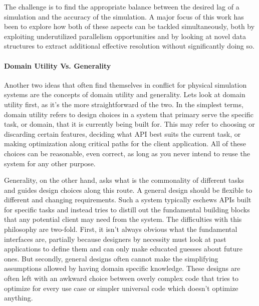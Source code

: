 The challenge is to find the appropriate balance between the desired
lag of a simulation and the accuracy of the simulation. A major
focus of this work has been to explore how both of these aspects can be
tackled simultaneously, both by exploiting underutilized parallelism
opportunities and by looking at novel data structures to extract
additional effective resolution without significantly doing so.
  
\paragraph{Domain Utility Vs. Generality}

Another two ideas that often find themselves in conflict for
physical simulation systems are the concepts of domain utility and
generality. Lets look at domain utility first, as it's the more
straightforward of the two. In the simplest terms, domain utility
refers to design choices in a system that primary serve the
specific task, or domain, that it is currently being built for. This
may refer to choosing or discarding certain features, deciding what
API best suits the current task, or making optimization along critical
paths for the client application. All of these choices can be
reasonable, even correct, as long as you never intend to reuse the
system for any other purpose.

Generality, on the other hand, asks what is the commonality of
different tasks and guides design choices along this route. A general
design should be flexible to different and changing requirements. Such
a system typically eschews APIs built for specific tasks and instead
tries to distill out the fundamental building blocks that any
potential client may need from the system. The difficulties with this
philosophy are two-fold. First, it isn't always obvious what the
fundamental interfaces are, partially because designers by necessity
must look at past applications to define them and can only make
educated guesses about future ones. But secondly, general designs
often cannot make the simplifying assumptions allowed by having domain
specific knowledge. These designs are often left with an awkward choice
between overly complex code that tries to optimize for every use case
or simpler universal code which doesn't optimize anything.

